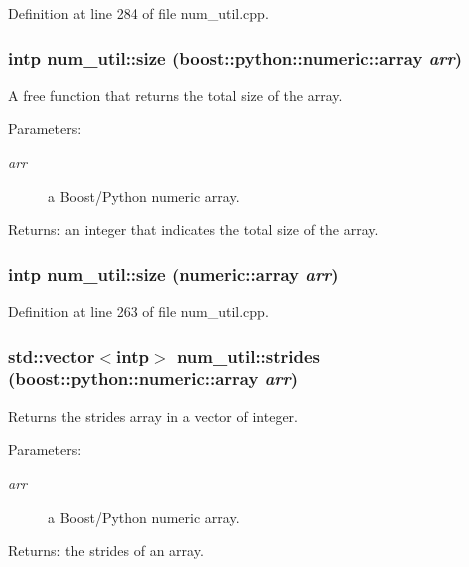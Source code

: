 Definition at line 284 of file num\_\-util.cpp.
\subsubsection{\setlength{\rightskip}{0pt plus 5cm}intp num\_\-util::size (boost::python::numeric::array {\em arr})}\label{namespacenum__util_a67}


A free function that returns the total size of the array. \begin{Desc}
\item[Parameters:]
\begin{description}
\item[{\em arr}]a Boost/Python numeric array. \end{description}
\end{Desc}
\begin{Desc}
\item[Returns:]an integer that indicates the total size of the array.\end{Desc}
\subsubsection{\setlength{\rightskip}{0pt plus 5cm}intp num\_\-util::size (numeric::array {\em arr})}\label{namespacenum__util_a40}




Definition at line 263 of file num\_\-util.cpp.
\subsubsection{\setlength{\rightskip}{0pt plus 5cm}std::vector$<$intp$>$ num\_\-util::strides (boost::python::numeric::array {\em arr})}\label{namespacenum__util_a74}


Returns the strides array in a vector of integer. \begin{Desc}
\item[Parameters:]
\begin{description}
\item[{\em arr}]a Boost/Python numeric array. \end{description}
\end{Desc}
\begin{Desc}
\item[Returns:]the strides of an array.\end{Desc}
